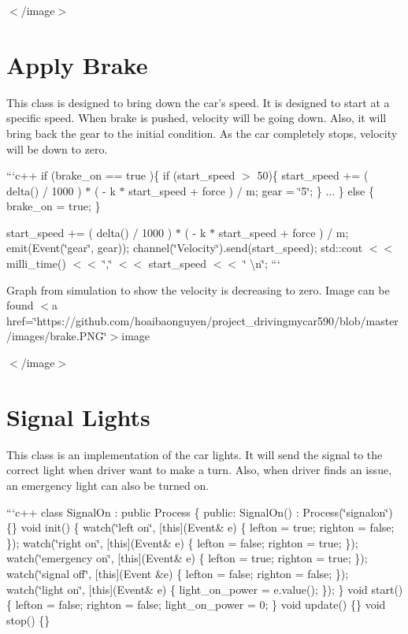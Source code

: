 $<$/image$>$

\section*{Apply Brake }

This class is designed to bring down the car's speed. It is designed to start at a specific speed. When brake is pushed, velocity will be going down. Also, it will bring back the gear to the initial condition. As the car completely stops, velocity will be down to zero.

```c++ if (brake\+\_\+on == true )\{ if (start\+\_\+speed $>$ 50)\{ start\+\_\+speed += ( delta() / 1000 ) $\ast$ ( -\/ k $\ast$ start\+\_\+speed + force ) / m; gear = \char`\"{}5\char`\"{}; \} ... \} else \{ brake\+\_\+on = true; \}

start\+\_\+speed += ( delta() / 1000 ) $\ast$ ( -\/ k $\ast$ start\+\_\+speed + force ) / m; emit(Event(\char`\"{}gear\char`\"{}, gear)); channel(\char`\"{}\+Velocity\char`\"{}).send(start\+\_\+speed); std\+::cout $<$$<$ milli\+\_\+time() $<$$<$ \char`\"{},\char`\"{} $<$$<$ start\+\_\+speed $<$$<$ \char`\"{} \textbackslash{}n\char`\"{}; ```

Graph from simulation to show the velocity is decreasing to zero. Image can be found $<$a href=\char`\"{}https\+://github.\+com/hoaibaonguyen/project\+\_\+drivingmycar590/blob/master/images/brake.\+P\+N\+G\char`\"{}$>$image

$<$/image$>$

\section*{Signal Lights }

This class is an implementation of the car lights. It will send the signal to the correct light when driver want to make a turn. Also, when driver finds an issue, an emergency light can also be turned on.

```c++ class Signal\+On \+: public Process \{ public\+: Signal\+On() \+: Process(\char`\"{}signalon\char`\"{}) \{\} void init() \{ watch(\char`\"{}left on\char`\"{}, \mbox{[}this\mbox{]}(Event\& e) \{ lefton = true; righton = false; \}); watch(\char`\"{}right on\char`\"{}, \mbox{[}this\mbox{]}(Event\& e) \{ lefton = false; righton = true; \}); watch(\char`\"{}emergency on\char`\"{}, \mbox{[}this\mbox{]}(Event\& e) \{ lefton = true; righton = true; \}); watch(\char`\"{}signal off\char`\"{}, \mbox{[}this\mbox{]}(Event \&e) \{ lefton = false; righton = false; \}); watch(\char`\"{}light on\char`\"{}, \mbox{[}this\mbox{]}(Event\& e) \{ light\+\_\+on\+\_\+power = e.\+value(); \}); \} void start() \{ lefton = false; righton = false; light\+\_\+on\+\_\+power = 0; \} void update() \{\} void stop() \{\}

